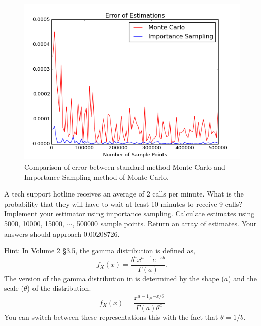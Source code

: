 \begin{figure}[H]
\includegraphics[width=\textwidth]{MCvsIS.png}
\caption{Comparison of error between standard method Monte Carlo and Importance Sampling method of Monte Carlo.}
\label{fig:compare}
\end{figure}

\begin{problem} \label{prob:gamma}
A tech support hotline receives an average of 2 calls per minute. What is the probability that they will have to wait at least 10 minutes to receive 9 calls? Implement your estimator using importance sampling. Calculate estimates using 5000, 10000, 15000, $\cdots$, 500000 sample points. Return an array of estimates. Your answers should approach $0.00208726$. 

Hint: In Volume 2 \S 3.5, the gamma distribution is defined as, $$f_X(x) = \frac{b^{a}x^{a-1}e^{-xb}}{\Gamma(a)}.$$ The version of the gamma distribution in  is determined by the shape ($a$) and the scale ($\theta$) of the distribution. $$f_X(x) = \frac{x^{a-1}e^{-x/\theta}}{\Gamma(a)\theta^a}$$
You can switch between these representations this with the fact that $\theta = 1/b$.
\end{problem}


